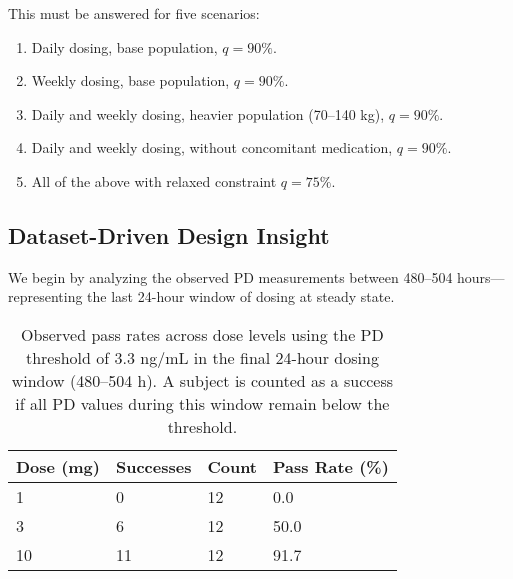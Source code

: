 \documentclass[11pt]{article}
\begin{document}
\vspace{0.5em}
This must be answered for five scenarios:

\begin{enumerate}
    \item Daily dosing, base population, \(q = 90\%\).
    \item Weekly dosing, base population, \(q = 90\%\).
    \item Daily and weekly dosing, heavier population (70–140 kg), \(q = 90\%\).
    \item Daily and weekly dosing, without concomitant medication, \(q = 90\%\).
    \item All of the above with relaxed constraint \(q = 75\%\).
\end{enumerate}

\subsection{Dataset-Driven Design Insight}

We begin by analyzing the observed PD measurements between 480–504 hours—representing the last 24-hour window of dosing at steady state. 

\begin{table}[H]
\centering
\renewcommand{\arraystretch}{1.3}
\begin{tabular}{p{2.5cm} p{2.5cm} p{2.5cm} p{3cm}}
\toprule
\textbf{Dose (mg)} & \textbf{Successes} & \textbf{Count} & \textbf{Pass Rate (\%)} \\
\midrule
1   & 0  & 12 & 0.0 \\
3   & 6  & 12 & 50.0 \\
10  & 11 & 12 & 91.7 \\
\bottomrule
\end{tabular}
\caption{\footnotesize Observed pass rates across dose levels using the PD threshold of 3.3 ng/mL in the final 24-hour dosing window (480–504 h). A subject is counted as a success if all PD values during this window remain below the threshold.}
\label{tab:pass-by-dose}
\end{table}
\end{document}
